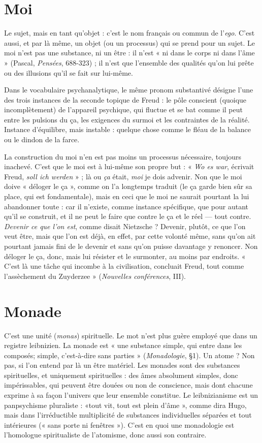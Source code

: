 \section{Moi}
Le sujet, mais en tant qu’objet : c’est le nom français ou commun de
l'{\it ego}. C’est aussi, et par là même, un objet (ou un processus) qui se
prend pour un sujet. Le moi n’est pas une substance, ni un être : il n’est « ni
dans le corps ni dans l’âme » (Pascal, {\it Pensées}, 688-323) ; il n’est que l’ensemble
des qualités qu’on lui prête ou des illusions qu’il se fait sur lui-même.

Dans le vocabulaire psychanalytique, le même pronom substantivé désigne
l’une des trois instances de la seconde topique de Freud : le pôle conscient
(quoique incomplètement) de l’appareil psychique, qui fluctue et se bat comme
il peut entre les pulsions du ça, les exigences du surmoi et les contraintes de la
réalité. Instance d'équilibre, mais instable : quelque chose comme le fléau de la
balance ou le dindon de la farce.

La construction du moi n’en est pas moins un processus nécessaire, toujours inachevé.
C’est que le moi est à lui-même son propre but : « {\it Wo es war},
écrivait Freud, {\it soll ich werden} » ; là ou {\it ça} était, {\it moi} je dois advenir. Non que le
moi doive « déloger le ça », comme on l’a longtemps traduit (le ça garde bien
sûr sa place, qui est fondamentale), mais en ceci que le moi ne saurait pourtant
la lui abandonner toute : car il n'existe, comme instance spécifique, que pour
autant qu'il se construit, et il ne peut le faire que contre le ça et le réel — tout
contre. {\it Devenir ce que l'on est}, comme disait Nietzsche ? Devenir, plutôt, ce que
l’on veut être, mais que l’on est déjà, en effet, par cette volonté même, sans
qu’on ait pourtant jamais fini de le devenir et sans qu’on puisse davantage y
renoncer. Non déloger le ça, donc, mais lui résister et le surmonter, au moins
par endroits. « C’est là une tâche qui incombe à la civilisation, concluait Freud,
tout comme l’assèchement du Zuyderzee » ({\it Nouvelles conférences}, III).

\section{Monade}
C'est une unité ({\it monas}) spirituelle. Le mot n’est plus guère
employé que dans un registre leibnizien. La monade est « une
substance simple, qui entre dans les composés; simple, c’est-à-dire sans
parties » ({\it Monadologie}, \S 1). Un atome ? Non pas, si l’on entend par là un être
matériel. Les monades sont des substances spirituelles, et uniquement
spirituelles : des âmes absolument simples, donc impérissables, qui peuvent être
douées ou non de conscience, mais dont chacune exprime à sa façon l’univers
que leur ensemble constitue. Le leibnizianisme est un panpsychisme pluraliste :
«tout vit, tout est plein d’âme », comme dira Hugo, mais dans l’irréductible
multiplicité de substances individuelles séparées et tout intérieures (« sans porte
ni fenêtres »). C’est en quoi une monadologie est l’homologue spiritualiste de
l’atomisme, donc aussi son contraire.


